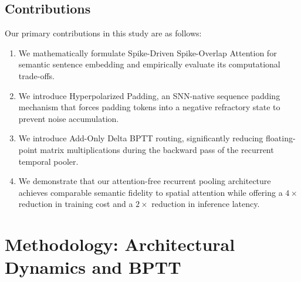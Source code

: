 \documentclass{article} %
\begin{document}
\subsection*{Contributions}
Our primary contributions in this study are as follows:
\begin{enumerate}
    \item We mathematically formulate Spike-Driven Spike-Overlap Attention for semantic sentence embedding and empirically evaluate its computational trade-offs.
    \item We introduce Hyperpolarized Padding, an SNN-native sequence padding mechanism that forces padding tokens into a negative refractory state to prevent noise accumulation.
    \item We introduce Add-Only Delta BPTT routing, significantly reducing floating-point matrix multiplications during the backward pass of the recurrent temporal pooler.
    \item We demonstrate that our attention-free recurrent pooling architecture achieves comparable semantic fidelity to spatial attention while offering a $4\times$ reduction in training cost and a $2\times$ reduction in inference latency.
\end{enumerate}

\section{Methodology: Architectural Dynamics and BPTT}
\end{document}
